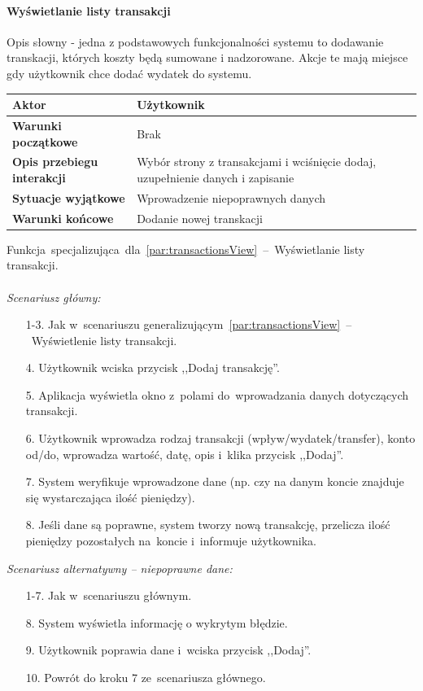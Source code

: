 \paragraph{Wyświetlanie listy transakcji\newline}
Opis słowny - jedna z podstawowych funkcjonalności systemu to dodawanie
transkacji, których koszty będą sumowane i nadzorowane. Akcje te mają miejsce
gdy użytkownik chce dodać wydatek do systemu.
\begin{longtable}{|p{5cm}|p{7cm}|}
 	\hline
	\textbf{Aktor} & Użytkownik \\
	\hline
	\textbf{Warunki początkowe} & Brak
	\\
	\hline
	\textbf{Opis przebiegu interakcji} & Wybór strony z transakcjami i wciśnięcie dodaj,
	uzupełnienie danych i zapisanie
	\\
	\hline
	\textbf{Sytuacje wyjątkowe} & Wprowadzenie niepoprawnych danych
	\\
	\hline
	\textbf{Warunki końcowe} & Dodanie nowej transkacji
	\\
	\hline
 \end{longtable}
Funkcja~specjalizująca~dla~\ref{par:transactionsView}~--~Wyświetlanie listy transakcji.\\\\
\textit{Scenariusz główny:}
\begin{enumerate}
  \item[1-3.] Jak w~scenariuszu generalizującym~\ref{par:transactionsView}~--~Wyświetlenie listy transakcji.
  \item[4.] Użytkownik wciska przycisk ,,Dodaj transakcję''.
  \item[5.] Aplikacja wyświetla okno z~polami do~wprowadzania danych dotyczących transakcji.
  \item[6.] Użytkownik wprowadza rodzaj transakcji (wpływ/wydatek/transfer), konto od/do, wprowadza wartość, datę, opis i~klika przycisk ,,Dodaj''.
  \item[7.] System weryfikuje wprowadzone dane (np. czy na danym koncie znajduje się wystarczająca ilość pieniędzy).
  \item[8.] Jeśli dane są poprawne, system tworzy nową transakcję, przelicza ilość pieniędzy pozostałych na~koncie i~informuje użytkownika.
\end{enumerate}
\textit{Scenariusz alternatywny -- niepoprawne dane:}
\begin{enumerate}
  \item[1-7.] Jak w~scenariuszu głównym.
  \item[8.] System wyświetla informację o wykrytym błędzie.
  \item[9.] Użytkownik poprawia dane i~wciska przycisk ,,Dodaj''.
  \item[10.] Powrót do kroku 7 ze~scenariusza głównego.
\end{enumerate}

